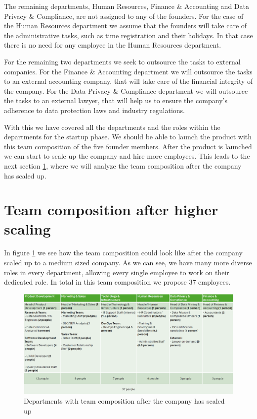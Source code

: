 \p
The remaining departments, Human Resources, Finance \& Accounting and Data Privacy \& Compliance, are not assigned to any of the founders.
For the case of the Human Resources department we assume that the founders will take care of the administrative tasks, such as time registration and their holidays.
In that case there is no need for any employee in the Human Resources department.

\p
For the remaining two departments we seek to outsource the tasks to external companies.
For the Finance \& Accounting department we will outsource the tasks to an external accounting company, that will take care of the financial integrity of the company.
For the Data Privacy \& Compliance department we will outsource the tasks to an external lawyer, that will help us to ensure the company's adherence to data protection laws and industry regulations.

\p
With this we have covered all the departments and the roles within the departments for the startup phase.
We should be able to launch the product with this team composition of the five founder members.
After the product is launched we can start to scale up the company and hire more employees.
This leads to the next section \ref{sec:team_comp_highscaled}, where we will analyze the team composition after the company has scaled up.

\section{Team composition after higher scaling}
\label{sec:team_comp_highscaled}

In figure \ref{fig:team_comp_highscaled} we see how the team composition could look like after the company scaled up to a medium sized company.
As we can see, we have many more diverse roles in every department, allowing every single employee to work on their dedicated role.
In total in this team composition we propose 37 employees.

\begin{figure}[H]
    \centering
    \includegraphics[width=\textwidth]{figures/team_comp_highscaled.png}
    \caption{Departments with team composition after the company has scaled up}
    \label{fig:team_comp_highscaled}
\end{figure}

